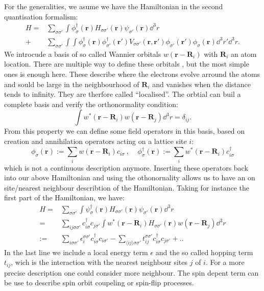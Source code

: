 \documentclass[../main.tex]{subfile}
\begin{document}
For the generalities, we asume we have the Hamiltonian in the second quantisation formalism:
\begin{align*}
    H = & \sum_{\sigma\sigma'} \int \phi_{\sigma}^{\dagger}(\bm{r}) H_{\sigma\sigma'}(\bm{r}) \psi_{\sigma'}(\bm{r}) \dd^3r\\
    + & \sum_{\sigma\sigma'} \int \int \phi_{\sigma}^{\dagger}(\bm{r})\phi_{\sigma'}^{\dagger}(\bm{r}') V_{\sigma\sigma'}(\bm{r},\bm{r}')
     \phi_{\sigma'}(\bm{r}')\phi_{\sigma}(\bm{r}) \dd^3r'\dd^3r.
\end{align*}
We introcude a basis of so called Wannier orbitals $w(\bm{r} - \bm{R}_i)$ with $\bm{R}_i$ an atom location. There are multiple way to define these orbitals \cite{Marzari},
but the most simple ones \cite{Wannier1937} is enough here. These describe where the electrons evolve arround the atoms and sould be large
 in the neighbourhood of $\bm{R}_i$ and vanishes when the distance tends to infinity.
They are therfore called ``localised''. The orbtial can buil a complete basis and verify the orthonormality condition:
\[
    \int w^{\ast}(\bm{r} - \bm{R}_i) w(\bm{r} - \bm{R}_j) \dd^3r = \delta_{ij}.
\]
From this property we can define some field operators in this basis, based on creation and annihilation operators acting on a lattice site $i$:
\begin{equation}\label{eq:Wannier_fieldOp}
    \phi_{\sigma}(\bm{r}) := \sum_{i} w(\bm{r} - \bm{R}_i) c_{i\sigma} ~,~~~~~ \phi_{\sigma}^{\dagger}(\bm{r}) := \sum_{i} w^{\ast}(\bm{r} - \bm{R}_i) c_{i\sigma}^{\dagger}
\end{equation}
which is not a continuous description anymore. 
Inserting these operators back into our above Hamiltonian and using the othonornality allows us to have an on site/nearest neighbour describtion of the Hamiltonian. Taking for
instance the first part of the Hamiltonian, we have:
\begin{align*}
    H = & \sum_{\sigma\sigma'} \int \psi_{\sigma}^{\dagger}(\bm{r}) H_{\sigma\sigma'}(\bm{r}) \psi_{\sigma'}(\bm{r}) \dd^3r\\
    =& \sum_{ij\sigma\sigma'} c_{i\sigma}^{\dagger} c_{j\sigma'}\int w^{\ast}(\bm{r} - \bm{R}_i) H_{\sigma\sigma'}(\bm{r}) w(\bm{r} - \bm{R}_j) \dd^3r\\
    := & \sum_{i\sigma\sigma'} \epsilon_i^{\sigma\sigma'} c_{i\sigma}^{\dagger} c_{i\sigma'} - \sum_{\langle ij\rangle\sigma\sigma'} t_{ij}^{\sigma\sigma'} c_{i\sigma}^{\dagger} c_{j\sigma'} + ..   
\end{align*}
In the last line we include a local energy term $\epsilon$ and the so called hopping term $t_{ij}$, wich is the interaction with the nearest neighbour sites $j$ of $i$.
For a more precise description one could consider more neighbour. The spin depent term can be use to describe spin orbit coupeling or spin-flip processes.\\
\end{document}
